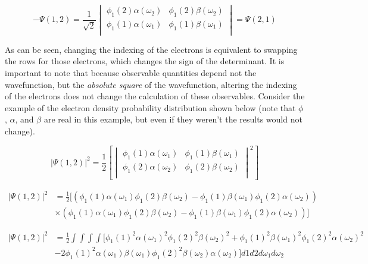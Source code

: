 \documentclass[12pt]{report}
\begin{document}
\begin{equation}
\label{eq:pauli_2t_4}
-\Psi(1,2) =
\frac{1}{\sqrt{2}}
\begin{vmatrix}
\phi_{1}(2)\alpha(\omega_{2})	&	\phi_{1}(2)\beta(\omega_{2})	\\
\phi_{1}(1)\alpha(\omega_{1})	&	\phi_{1}(1)\beta(\omega_{1})	\\
\end{vmatrix}
=\Psi(2,1)
\end{equation}

As can be seen, changing the indexing of the electrons is equivalent to swapping the rows for those electrons, which changes the sign of the determinant. It is important to note that because observable quantities depend not the wavefunction, but the \textit{absolute square} of the wavefunction, altering the indexing of the electrons does not change the calculation of these observables. Consider the example of the electron density probability distribution shown below (note that $\phi$, $\alpha$, and $\beta$ are real in this example, but even if they weren't the results would not change).

\begin{equation}
\label{eq:el_prob_dist_1}
|\Psi(1,2)|^{2} =
\frac{1}{2}\left[
\begin{vmatrix}
\phi_{1}(1)\alpha(\omega_{1})		&	\phi_{1}(1)\beta(\omega_{1})		\\
\phi_{1}(2)\alpha(\omega_{2})		&	\phi_{1}(2)\beta(\omega_{2})		\\
\end{vmatrix}^2
\right]
\end{equation}

\begin{equation}
\label{eq:el_prob_dist_2}
\begin{split}
|\Psi(1,2)|^{2}	&	=
\frac{1}{2}
[
\left(
\phi_{1}(1)\alpha(\omega_{1})\phi_{1}(2)\beta(\omega_{2}) -
\phi_{1}(1)\beta(\omega_{1})\phi_{1}(2)\alpha(\omega_{2})
\right)	\\
	&	\times\left(
\phi_{1}(1)\alpha(\omega_{1})\phi_{1}(2)\beta(\omega_{2}) -
\phi_{1}(1)\beta(\omega_{1})\phi_{1}(2)\alpha(\omega_{2})
\right)
]
\end{split}
\end{equation}

\begin{equation}
\label{eq:el_prob_dist_3}
\begin{split}
|\Psi(1,2)|^{2}	&	=
\frac{1}{2}\int\int\int\int
[
\phi_{1}(1)^{2}\alpha(\omega_{1})^{2}\phi_{1}(2)^{2}\beta(\omega_{2})^{2} +
\phi_{1}(1)^{2}\beta(\omega_{1})^{2}\phi_{1}(2)^{2}\alpha(\omega_{2})^{2}
	\\
	&	-2
\phi_{1}(1)^{2}\alpha(\omega_{1})\beta(\omega_{1})\phi_{1}(2)^{2}\beta(\omega_{2})\alpha(\omega_{2})
]d1d2d\omega_{1}d\omega_{2}
\end{split}
\end{equation}
\end{document}
